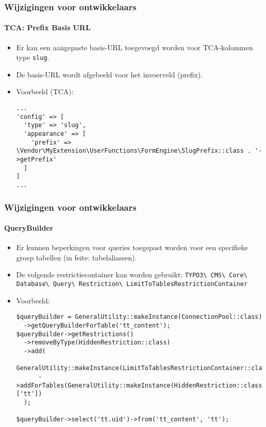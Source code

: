 \begin{frame}[fragile]
	\frametitle{Wijzigingen voor ontwikkelaars}
	\framesubtitle{TCA: Prefix Basis URL}

	\lstset{basicstyle=\tiny\ttfamily}

	\begin{itemize}

		\item Er kan een aangepaste basis-URL toegevoegd worden voor TCA-kolommen type \texttt{slug}.
		\item De basis-URL wordt afgebeeld voor het invoerveld (prefix).
		\item Voorbeeld (TCA):

\vspace{-0.4cm}
\begin{lstlisting}
...
'config' => [
  'type' => 'slug',
  'appearance' => [
    'prefix' => \Vendor\MyExtension\UserFunctions\FormEngine\SlugPrefix::class . '->getPrefix'
  ]
]
...
\end{lstlisting}

	\end{itemize}

\end{frame}


\begin{frame}[fragile]
	\frametitle{Wijzigingen voor ontwikkelaars}
	\framesubtitle{QueryBuilder}

	\lstset{basicstyle=\tiny\ttfamily}

	\begin{itemize}
		\item Er kunnen beperkingen voor queries toegepast worden voor een
			specifieke groep tabellen (in feite: tabelaliassen).
		\item De volgende restrictiecontainer kan worden gebruikt:\newline
			\begingroup
				\fontsize{7}{9}
					\texttt{TYPO3\textbackslash
						CMS\textbackslash
						Core\textbackslash
						Database\textbackslash
						Query\textbackslash
						Restriction\textbackslash
						LimitToTablesRestrictionContainer}
			\endgroup

		\item Voorbeeld:
\begin{lstlisting}
$queryBuilder = GeneralUtility::makeInstance(ConnectionPool::class)
  ->getQueryBuilderForTable('tt_content');
$queryBuilder->getRestrictions()
  ->removeByType(HiddenRestriction::class)
  ->add(
    GeneralUtility::makeInstance(LimitToTablesRestrictionContainer::class)
      ->addForTables(GeneralUtility::makeInstance(HiddenRestriction::class), ['tt'])
  );

$queryBuilder->select('tt.uid')->from('tt_content', 'tt');
\end{lstlisting}

	\end{itemize}

\end{frame}

